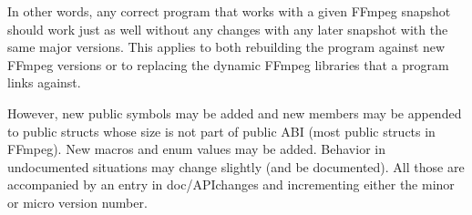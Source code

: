 In other words, any correct program that works with a given F\+Fmpeg snapshot should work just as well without any changes with any later snapshot with the same major versions. This applies to both rebuilding the program against new F\+Fmpeg versions or to replacing the dynamic F\+Fmpeg libraries that a program links against.

However, new public symbols may be added and new members may be appended to public structs whose size is not part of public A\+BI (most public structs in F\+Fmpeg). New macros and enum values may be added. Behavior in undocumented situations may change slightly (and be documented). All those are accompanied by an entry in doc/\+A\+P\+Ichanges and incrementing either the minor or micro version number. 